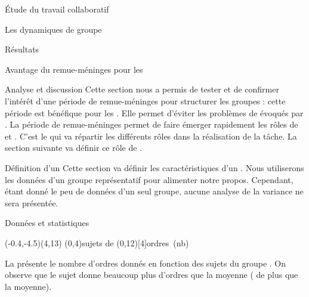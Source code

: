 \documentclass[myfrancais]{mythesis}
\begin{document}
\begin{mypart}{Étude du travail collaboratif}
\begin{mychapter}{Les dynamiques de groupe}
\begin{mysection}{Résultats}
\begin{mysubsection}{Avantage du remue-méninges pour les }
\begin{mysubsubsection}{Analyse et discussion}
						Cette section nous a permis de tester et de confirmer l'intérêt d'une période de remue-méninges pour structurer les groupes : cette période est bénéfique pour les .
						Elle permet d'éviter les problèmes de  évoqués par .
						La période de remue-méninges permet de faire émerger rapidement les rôles de  et .
						C'est le  qui va répartir les différents rôles dans la réalisation de la tâche.
						La section suivante va définir ce rôle de .
					\end{mysubsubsection}
				\end{mysubsection}
				\begin{mysubsection}{Définition d'un }
					Cette section va définir les caractéristiques d'un .
					Nous utiliserons les données d'un groupe représentatif pour alimenter notre propos.
					Cependant, étant donné le peu de données d'un seul groupe, aucune analyse de la variance ne sera présentée.
					\begin{mysubsubsection}{Données et statistiques}
						\begin{myfigure}
							\begin{myps}(-0.4,-4.5)(4,13)
								\myaxes(0,4){sujets de }(0,12)[4]{ordres~(nb)}
							\end{myps}
						\end{myfigure}

						La  présente le nombre d'ordres donnés  en fonction des sujets du groupe .
						On observe que le sujet  donne beaucoup plus d'ordres que la moyenne ( de plus que la moyenne).


\end{mysubsubsection}
\end{mysubsection}
\end{mysection}
\end{mychapter}
\end{mypart}
\end{document}
